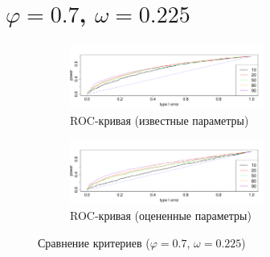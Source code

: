 \documentclass[specialist,
substylefile = spbu_report.rtx,
subf,href,colorlinks=true, 12pt]{disser}
\theoremstyle{definition}
\begin{document}
\section{$\varphi=0.7$, $\omega=0.225$}
\begin{figure}[h!]
	\captionsetup[subfigure]{justification=Centering}
	\begin{subfigure}[t]{\textwidth}
		\centering
		\includegraphics[width=0.7\textwidth]{img/roc_phi7_omega0225.pdf}
		\caption{ROC-кривая (известные параметры)}
		\label{fig:arima_roc}
	\end{subfigure}
	\begin{subfigure}[t]{\textwidth}
		\centering
		\includegraphics[width=0.7\textwidth]{img/roc_phi7est_omega0225.pdf}
		\caption{ROC-кривая (оцененные параметры)}
		\label{fig:extract_roc}
	\end{subfigure}
	\caption{Сравнение критериев ($\varphi=0.7$, $\omega=0.225$)}
\end{figure}
\end{document}
